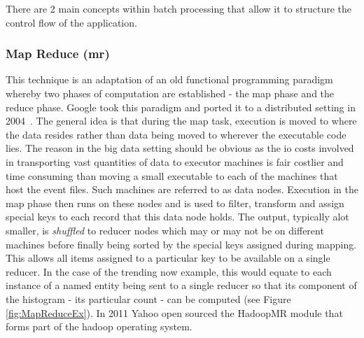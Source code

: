 \documentclass[a4paper,11pt]{scrreprt}
\begin{document}
There are 2 main concepts within batch processing that allow it to structure the control flow of the application.

\subsubsection{Map Reduce (\acrshort{mr})}
This technique is an adaptation of an old functional programming paradigm whereby two phases of computation are established - the map phase and the reduce phase. Google took this paradigm and ported it to a distributed setting in 2004~\cite{mapreduce}. The general idea is that during the map task, execution is moved to where the data resides rather than data being moved to wherever the executable code lies. The reason in the big data setting should be obvious as the \acrshort{io} costs involved in transporting vast quantities of data to executor machines is fair costlier and time consuming than moving a small executable to each of the machines that host the event files. Such machines are referred to as data nodes. Execution in the map phase then runs on these nodes and is used to filter, transform and assign special keys to each record that this data node holds. The output, typically alot smaller, is \textit{shuffled} to reducer nodes which may or may not be on different machines before finally being sorted by the special keys assigned during mapping. This allows all items assigned to a particular key to be available on a single reducer. In the case of the trending now example, this would equate to each instance of a named entity being sent to a single reducer so that its component of the histogram - its particular count - can be computed (see Figure \ref{fig:MapReduceEx}). In 2011 Yahoo open sourced the HadoopMR\autocite{hadoopMR} module that forms part of the hadoop operating system.\\
\end{document}
